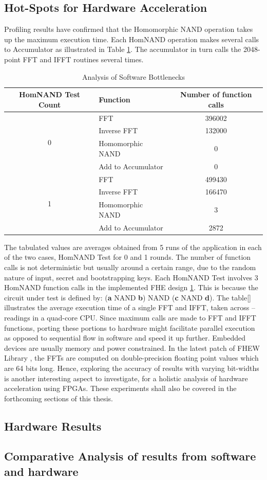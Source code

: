 \subsection{Hot-Spots for Hardware Acceleration}
\label{5_1_2}
Profiling results have confirmed that the Homomorphic NAND operation takes up the maximum execution time. Each HomNAND operation makes several calls to Accumulator as illustrated in Table \ref{table:sw_hotspots_fhe}. The accumulator in turn calls the 2048-point FFT and IFFT routines several times.
\begin{table}[htbp]
\caption{Analysis of Software Bottlenecks}
\centering
\begin{tabular}{c p{4.5cm} c}
\toprule
HomNAND Test Count & Function & Number of function calls\\
\midrule
\multirow{4}{*}{0}&FFT&396002\\
\cmidrule(r{4pt}){2-3}
  &Inverse FFT&132000\\
\cmidrule(r{4pt}){2-3}
 &Homomorphic NAND&0\\
\cmidrule(r{4pt}){2-3}
 &Add to Accumulator&0\\
\midrule
\multirow{4}{*}{1}&FFT&499430\\
\cmidrule(r{4pt}){2-3}
 &Inverse FFT&166470\\
\cmidrule(r{4pt}){2-3}
 &Homomorphic NAND&3\\
\cmidrule(r{4pt}){2-3}
 &Add to Accumulator&2872\\
\bottomrule
\end{tabular}
\label{table:sw_hotspots_fhe}
\end{table}
The tabulated values are averages obtained from 5 runs of the application in each of the two cases, HomNAND Test for 0 and 1 rounds. The number of function calls is not deterministic but usually around a certain range, due to the random nature of input, secret and bootstrapping keys. Each HomNAND Test involves 3 HomNAND function calls in the implemented FHE design \cite{fhew_lib} \ref{table:sw_hotspots_fhe}. This is because the circuit under test is defined by: (\textbf{a} NAND \textbf{b}) NAND (\textbf{c} NAND \textbf{d}).\newline \newline
The table[] illustrates the average execution time of a single FFT and IFFT, taken across --readings in a quad-core CPU. Since maximum calls are made to FFT and IFFT functions, porting these portions to hardware might facilitate parallel execution as opposed to sequential flow in software and speed it up further. Embedded devices are usually memory and power constrained. In the latest patch of FHEW Library \cite{fhew_lib}, the FFTs are computed on double-precision floating point values which are 64 bits long. Hence, exploring the accuracy of results with varying bit-widths is another interesting aspect to investigate, for a holistic analysis of hardware acceleration using FPGAs. These experiments shall also be covered in the forthcoming sections of this thesis.
\subsection{Hardware Results}
\label{5_1_2}

\subsection{Comparative Analysis of results from software and hardware}
\label{5_1_3}